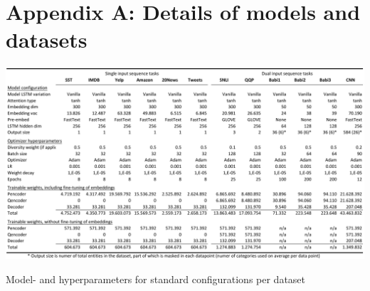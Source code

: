 \section*{Appendix A: Details of models and datasets}

\begin{table}[h]
\centering
\includegraphics[width=\textwidth]{./figures/hyperparams.pdf}
\caption{Model- and hyperparameters for standard configurations per dataset}
\label{fig:hyperparams}
\end{table}

